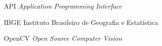 \begin{siglas}
    \item[API] \textit{Application Programming Interface}
	\item[IBGE] {Instituto Brasileiro de Geografia e Estatística}
	\item[OpenCV] \textit{Open Source Computer Vision}

\end{siglas}
